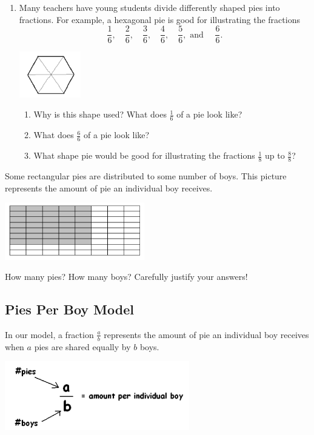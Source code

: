 \begin{enumerate}
\item
Many teachers have young students divide differently shaped pies
into fractions. For example, a hexagonal pie is good for illustrating the fractions
\[
\frac 1 6, \quad
\frac 2 6, \quad
\frac 3 6, \quad
\frac 4 6, \quad
\frac 5 6, \text{ and }\quad
\frac 6 6.
\]

\begin{center}
\includegraphics[height = 2cm]{hexpie}
\end{center}


\begin{enumerate}
\item
Why is this shape used?  What does $\frac 1 6$ of a pie look like?

\item
What does $\frac 6 6 $ of a pie look like?

\item
What shape pie would be good for illustrating the fractions $\frac 1 8 $ up to $\frac 8 8$?
\end{enumerate}

 \end{enumerate}
 
 
 
 
 \begin{problem}
 Some rectangular pies are distributed to some number of boys. This picture
represents the amount of pie an individual boy receives.
 \begin{center}
\includegraphics[height = 2.5cm]{rectpie}
\end{center}
 How many pies?  How many boys?  Carefully justify your answers!
 
 \end{problem}
 
 
 
 
\subsection{Pies Per Boy Model}
In our model, a fraction
$\frac a b$ represents the amount of pie an individual boy
receives when $a$ pies are shared equally by  $b$ boys.
  \begin{center}
\includegraphics[height = 3cm]{PPBmodel}
\end{center}

